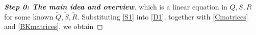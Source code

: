\documentclass[11pt,a4paper,oneside,DIV=12,headings=small]{scrartcl}
\theoremstyle{plain}
\begin{document}
\begin{proof}[\textbf{Step 0: \textit{The main idea and overview}}]
%
%
which is a linear equation in $Q, S, R$ for some known $\tilde{Q}, \tilde{S}, \tilde{R}$.
Substituting \eqref{S1} into \eqref{D1}, together with \eqref{Cmatrices} and \eqref{BKmatrices}, we obtain
%
%


\end{proof}
\end{document}
